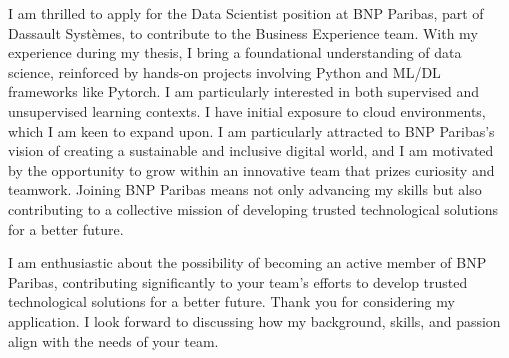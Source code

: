 \documentclass[11pt,a4paper]{lettre}
\begin{document}
\begin{letter}
I am thrilled to apply for the Data Scientist position at BNP Paribas, part of Dassault Systèmes, to contribute to the Business Experience team. With my experience during my thesis,  
I bring a foundational understanding of data science, reinforced by hands-on projects involving Python and ML/DL frameworks like Pytorch. 
I am particularly interested in both supervised and unsupervised learning contexts. I have initial exposure to cloud environments, which I am keen to expand upon. I am particularly attracted to BNP Paribas's vision of creating a sustainable and inclusive digital world, and I am motivated by the opportunity to grow within an innovative team that prizes curiosity and teamwork. Joining BNP Paribas means not only advancing my skills but also contributing to a collective mission of developing trusted technological solutions for a better future.
\closing{\hspace{1em}
I am enthusiastic about the possibility of becoming an active member of BNP Paribas, contributing significantly to your team's efforts to develop trusted technological solutions for a better future. Thank you for considering my application. I look forward to discussing how my background, skills, and passion align with the needs of your team.
}
\end{letter}
\end{document}
